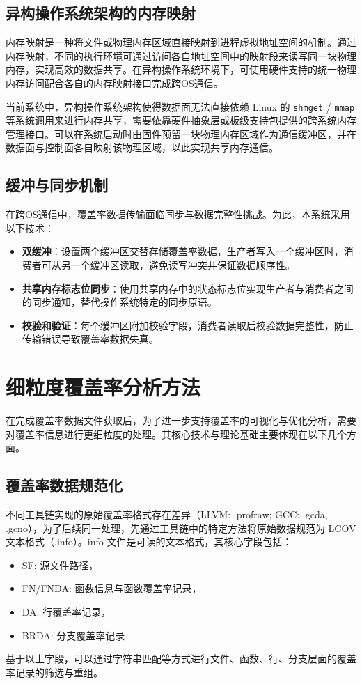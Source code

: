 \subsection{异构操作系统架构的内存映射}
    内存映射是一种将文件或物理内存区域直接映射到进程虚拟地址空间的机制。通过内存映射，不同的执行环境可通过访问各自地址空间中的映射段来读写同一块物理内存，实现高效的数据共享。在异构操作系统环境下，可使用硬件支持的统一物理内存访问配合各自的内存映射接口完成跨OS通信\cite{Song2016EfficientMI}\cite{黄向平2020基于内存映射文件的复杂对象快速读取方法}。

    当前系统中，异构操作系统架构使得数据面无法直接依赖 Linux 的 \verb|shmget| / \verb|mmap| 等系统调用来进行内存共享，需要依靠硬件抽象层或板级支持包提供的跨系统内存管理接口\cite{汪敏2023Linux中多种内存共享机制及其应用探究}\cite{Ouaiss2001HierarchicalMM}\cite{Hillenbrand2017MultiplePM}。可以在系统启动时由固件预留一块物理内存区域作为通信缓冲区，并在数据面与控制面各自映射该物理区域，以此实现共享内存通信。

\subsection{缓冲与同步机制}
    在跨OS通信中，覆盖率数据传输面临同步与数据完整性挑战\cite{余翔湛2004动态共享内存缓冲池技术}。为此，本系统采用以下技术：
    \begin{itemize}
        \item \textbf{双缓冲}：设置两个缓冲区交替存储覆盖率数据，生产者写入一个缓冲区时，消费者可从另一个缓冲区读取，避免读写冲突并保证数据顺序性。
        \item \textbf{共享内存标志位同步}：使用共享内存中的状态标志位实现生产者与消费者之间的同步通知，替代操作系统特定的同步原语。
        \item \textbf{校验和验证}：每个缓冲区附加校验字段，消费者读取后校验数据完整性，防止传输错误导致覆盖率数据失真。
    \end{itemize}

\section{细粒度覆盖率分析方法}
    在完成覆盖率数据文件获取后，为了进一步支持覆盖率的可视化与优化分析，需要对覆盖率信息进行更细粒度的处理。其核心技术与理论基础主要体现在以下几个方面。

\subsection{覆盖率数据规范化}
    不同工具链实现的原始覆盖率格式存在差异（LLVM: .profraw; GCC: .gcda, .gcno），为了后续同一处理，先通过工具链中的特定方法将原始数据规范为 LCOV 文本格式（.info）。info 文件是可读的文本格式，其核心字段包括：
    \begin{itemize}
        \item SF: 源文件路径，
        \item FN/FNDA: 函数信息与函数覆盖率记录，
        \item DA: 行覆盖率记录，
        \item BRDA: 分支覆盖率记录
    \end{itemize}
    基于以上字段，可以通过字符串匹配等方式进行文件、函数、行、分支层面的覆盖率记录的筛选与重组\cite{lcov_info_format}。

